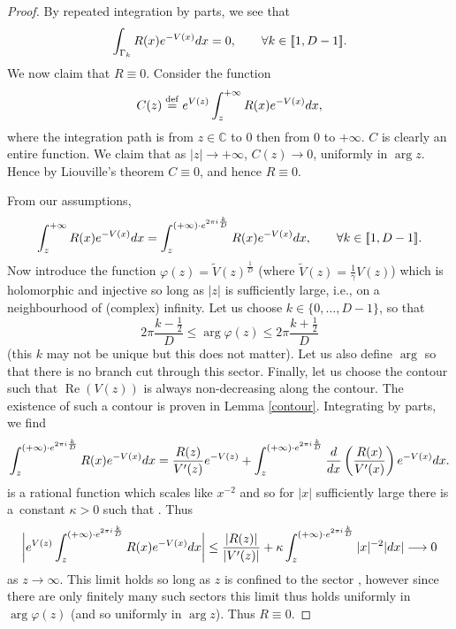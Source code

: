 \documentclass[11pt]{article}
\numberwithin{equation}{section}
\numberwithin{equation}{section}
\begin{document}
\begin{proof}
By repeated integration by parts, we see that
\begin{align*}
\int_{\Gamma_k} R(x) {\rm e}^{-V(x)} {\rm d}x = 0,\qquad \forall k \in [\![ 1,D-1]\!].
\end{align*}
We now claim that $R \equiv 0$. Consider the function
\begin{equation*}
C(z) \overset{\mathrm{def}}{=} {\rm e}^{V(z)}\int_z^{+\infty} R(x) {\rm e}^{-V(x)} {\rm d}x,
\end{equation*}
where the integration path is from $z \in \mathbb{C}$ to $0$ then from $0$ to $+\infty$. $C$ is clearly an entire function. We claim that as $|z| \to +\infty$, $C(z) \to 0$, uniformly in $\operatorname{arg} z $. Hence by Liouville's theorem $C \equiv 0$, and hence $R \equiv 0$.

From our assumptions,
\begin{align*}
\int_z^{+\infty} R(x) {\rm e}^{-V(x)} {\rm d}x = \int_z^{(+\infty) \cdot {\rm e}^{2\pi {\rm i} \frac{k}{D}}} R(x) {\rm e}^{-V(x)} {\rm d}x,\qquad \forall k \in [\![ 1,D-1]\!].
\end{align*}
Now introduce the function $\varphi(z) = \tilde{V}(z)^\frac{1}{D}$ \big(where $\tilde{V}(z) = \frac{1}{\gamma}V(z)$\big) which is holomorphic and injective so long as $|z|$ is sufficiently large, i.e., on a neighbourhood of (complex) infinity. Let us choose $k \in \{0, \dots, D-1\}$, so that
\[
 2\pi \frac{k-\frac{1}{2}}{D} \leq \arg \varphi(z) \leq 2\pi \frac{k+\frac{1}{2}}{D}
\]
 (this $k$ may not be unique but this does not matter). Let us also define $\arg$ so that there is no branch cut through this sector. Finally, let us choose the contour such that $\operatorname{Re} (V(z))$ is always non-decreasing along the contour. The existence of such a contour is proven in Lemma \ref{contour}. Integrating by parts, we find
\begin{align*}
\int_z^{(+\infty) \cdot {\rm e}^{2\pi {\rm i} \frac{k}{D}}} R(x) {\rm e}^{-V(x)} {\rm d}x = \frac{R(z)}{V^\prime(z)} {\rm e}^{-V(z)}+ \int_z^{(+\infty) \cdot {\rm e}^{2\pi {\rm i} \frac{k}{D}}} \frac{\rm d}{{\rm d}x}\left( \frac{R(x)}{V^\prime(x)} \right) {\rm e}^{-V(x)} {\rm d}x.
\end{align*}
 is a rational function which scales like $x^{-2}$ and so for $|x|$ sufficiently large there is a~constant $\kappa>0$ such that . Thus
\begin{equation*}
\bigg|{\rm e}^{V(z)} \int_z^{(+\infty) \cdot {\rm e}^{2\pi {\rm i} \frac{k}{D}}} R(x) {\rm e}^{-V(x)} {\rm d}x\bigg| \leq \frac{|R(z)|}{|V^\prime(z)|}+ \kappa\int_z^{(+\infty) \cdot {\rm e}^{2\pi {\rm i} \frac{k}{D}}}|x|^{-2} |{\rm d}x| \longrightarrow 0
\end{equation*}
as $z \to \infty$. This limit holds so long as $z$ is confined to the sector , however since there are only finitely many such sectors this limit thus holds uniformly in $\operatorname{arg} \varphi(z)$ (and so uniformly in $\operatorname{arg} z$). Thus $R \equiv 0$.


\end{proof}
\end{document}
